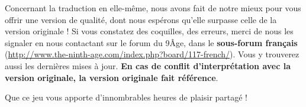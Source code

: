 {Concernant la traduction en elle-même, nous avons fait de notre mieux pour vous offrir une version de qualité, dont nous espérons qu'elle surpasse celle de la version originale ! Si vous constatez des coquilles, des erreurs, merci de nous les signaler en nous contactant sur le forum du 9\ieme Âge, dans le \textbf{sous-forum français} (\url{http://www.the-ninth-age.com/index.php?board/117-french/}). Vous y trouverez aussi les dernières mises à jour. \textbf{En cas de conflit d'interprétation avec la version originale, la version originale fait référence}.

\vspace{0.5cm}
Que ce jeu vous apporte d'innombrables heures de plaisir partagé !

\vspace{0.7cm}
\vspace{0.1cm}

}
\newcommand{\labels@secondpageannouncement}{%
	\labels@fantasybattles{} : \labels@NinthAge{} est un jeu créé et entretenu par la communauté qui met en scène des affrontements de figurines. Toutes les règles ainsi que les retours et suggestions peuvent être trouvées ou donnés sur le site :
	\newline\url{http://www.the-ninth-age.com/}
}
\newcommand{\labels@rulechanges}{%
	Les changements de règles entre versions sont colorés comme ce paragraphe. Une liste en anglais de ces changements par version est ajoutée à la fin de cet ouvrage.
}
\newcommand{\labels@latexcredit}{Document réalisé à l'aide de \LaTeX .}



\newcommand{\free}{gratuit}
\newcommand{\upto}{jusqu'à}
\newcommand{\Upto}{Jusqu'à}
\newcommand{\unlimited}{sans limite de pts}
\newcommand{\permodel}{/fig.}
\newcommand{\listlastchoice}{, ou}
\newcommand{\notif}[1]{(pas #1)}
\newcommand{\wordand}{et}
\newcommand{\wordwith}{avec}
\newcommand{\ifNmodelsorless}[1]{(#1 figurines ou moins)}
\newcommand{\unitwith}{unité avec}
\newcommand{\From}{De} %
\newcommand{\wordto}{à}
\newcommand{\wordAll}{Tous}
\newcommand{\spacebeforecolon}{ } %
\newcommand{\pricepermodelabovemin}{Coût par fig. au delà de la taille minimale :}
\newcommand{\minprice}{Coût min. :}


